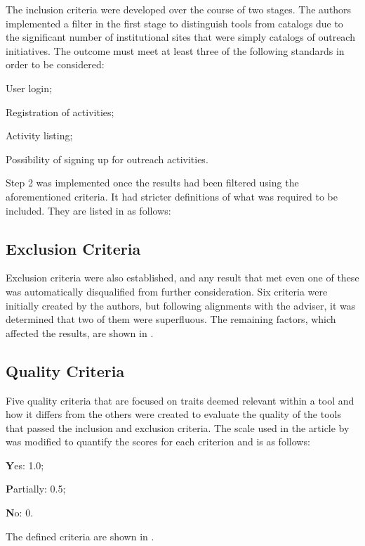 The inclusion criteria were developed over the course of two stages. The authors implemented a filter in the first stage to distinguish tools from catalogs due to the significant number of institutional sites that were simply catalogs of outreach initiatives. The outcome must meet at least three of the following standards in order to be considered:
\begin{inparaenum}[(a)]
  \item User login;
  \item Registration of activities;
  \item Activity listing;
  \item Possibility of signing up for outreach activities.
\end{inparaenum}

Step 2 was implemented once the results had been filtered using the aforementioned criteria. It had stricter definitions of what was required to be included. They are listed in  as follows:



\subsection{Exclusion Criteria}\label{sec:gl-planning-exc}

Exclusion criteria were also established, and any result that met even one of these was automatically disqualified from further consideration. Six criteria were initially created by the authors, but following alignments with the adviser, it was determined that two of them were superfluous. The remaining factors, which affected the results, are shown in .



\subsection{Quality Criteria}\label{sec:gl-planning-qlty}

Five quality criteria that are focused on traits deemed relevant within a tool and how it differs from the others were created to evaluate the quality of the tools that passed the inclusion and exclusion criteria. The scale used in the article by  was modified to quantify the scores for each criterion and is as follows:
\begin{inparaenum}[(i)]
  \item \textbf{Y}es: 1.0;
  \item \textbf{P}artially: 0.5;
  \item \textbf{N}o: 0.
\end{inparaenum}
The defined criteria are shown in .

